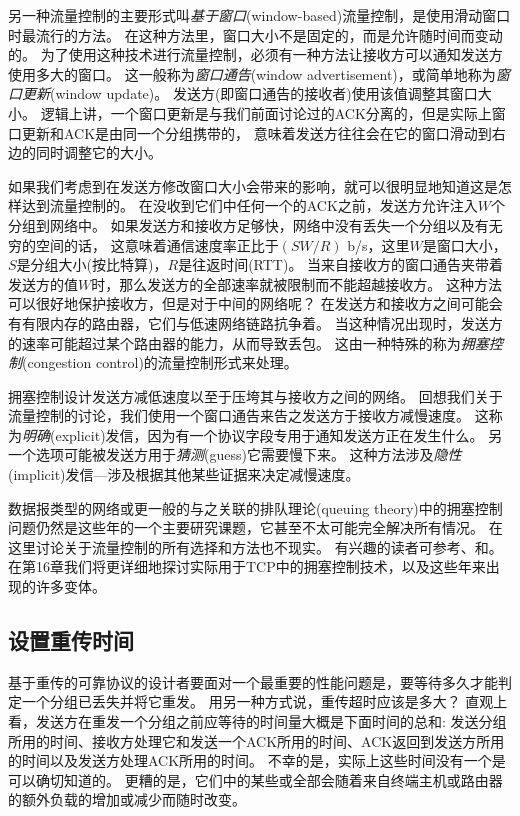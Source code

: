 \documentclass{../main.tex}{subfiles}
\begin{document}
另一种流量控制的主要形式叫\emph{基于窗口}(window-based)流量控制，是使用滑动窗口时最流行的方法。
在这种方法里，窗口大小不是固定的，而是允许随时间而变动的。
为了使用这种技术进行流量控制，必须有一种方法让接收方可以通知发送方使用多大的窗口。
这一般称为\emph{窗口通告}(window advertisement)，或简单地称为\emph{窗口更新}(window update)。
发送方(即窗口通告的接收者)使用该值调整其窗口大小。
逻辑上讲，一个窗口更新是与我们前面讨论过的ACK分离的，但是实际上窗口更新和ACK是由同一个分组携带的，
    意味着发送方往往会在它的窗口滑动到右边的同时调整它的大小。

如果我们考虑到在发送方修改窗口大小会带来的影响，就可以很明显地知道这是怎样达到流量控制的。
在没收到它们中任何一个的ACK之前，发送方允许注入$W$个分组到网络中。
如果发送方和接收方足够快，网络中没有丢失一个分组以及有无穷的空间的话，
    这意味着通信速度率正比于$(SW/R)$ b/s，这里$W$是窗口大小，$S$是分组大小(按比特算)，$R$是往返时间(RTT)。
当来自接收方的窗口通告夹带着发送方的值$W$时，那么发送方的全部速率就被限制而不能超越接收方。
这种方法可以很好地保护接收方，但是对于中间的网络呢？
在发送方和接收方之间可能会有有限内存的路由器，它们与低速网络链路抗争着。
当这种情况出现时，发送方的速率可能超过某个路由器的能力，从而导致丢包。
这由一种特殊的称为\emph{拥塞控制}(congestion control)的流量控制形式来处理。

拥塞控制设计发送方减低速度以至于压垮其与接收方之间的网络。
回想我们关于流量控制的讨论，我们使用一个窗口通告来告之发送方于接收方减慢速度。
这称为\emph{明确}(explicit)发信，因为有一个协议字段专用于通知发送方正在发生什么。
另一个选项可能被发送方用于\emph{猜测}(guess)它需要慢下来。
这种方法涉及\emph{隐性}(implicit)发信---涉及根据其他某些证据来决定减慢速度。

数据报类型的网络或更一般的与之关联的排队理论(queuing theory)中的拥塞控制问题仍然是这些年的一个主要研究课题，它甚至不太可能完全解决所有情况。
在这里讨论关于流量控制的所有选择和方法也不现实。
有兴趣的读者可参考\cite{Jain1990Congestion}、\cite{1997An}和\cite{Kleinrock1975Queueing}。
在第16章我们将更详细地探讨实际用于TCP中的拥塞控制技术，以及这些年来出现的许多变体。


\subsection{设置重传时间}
基于重传的可靠协议的设计者要面对一个最重要的性能问题是，要等待多久才能判定一个分组已丢失并将它重发。
用另一种方式说，重传超时应该是多大？
直观上看，发送方在重发一个分组之前应等待的时间量大概是下面时间的总和:
发送分组所用的时间、接收方处理它和发送一个ACK所用的时间、ACK返回到发送方所用的时间以及发送方处理ACK所用的时间。
不幸的是，实际上这些时间没有一个是可以确切知道的。
更糟的是，它们中的某些或全部会随着来自终端主机或路由器的额外负载的增加或减少而随时改变。
\end{document}
